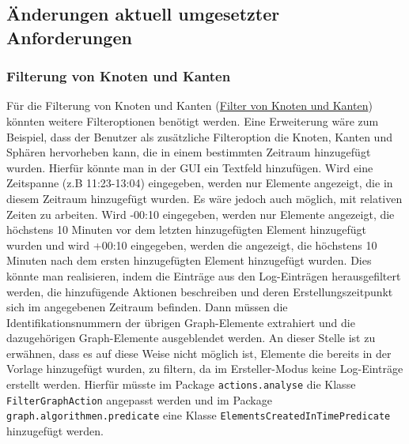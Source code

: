 \documentclass[enabledeprecatedfontcommands,fontsize=11pt,paper=a4,twoside]{scrartcl}
\newcounter{one}
\begin{document}
	\subsection{Änderungen aktuell umgesetzter Anforderungen}
	\subsubsection{Filterung von Knoten und Kanten}
	Für die Filterung von Knoten und Kanten (\hyperlink{ss}{Filter von Knoten und Kanten}) könnten weitere Filteroptionen benötigt werden. Eine Erweiterung wäre zum Beispiel, dass der Benutzer als zusätzliche Filteroption die Knoten, Kanten und Sphären hervorheben kann, die in einem bestimmten Zeitraum hinzugefügt wurden. Hierfür könnte man in der GUI  ein Textfeld hinzufügen. Wird eine Zeitspanne (z.B 11:23-13:04) eingegeben, werden nur Elemente angezeigt, die in diesem Zeitraum hinzugefügt wurden. Es wäre jedoch auch möglich, mit relativen Zeiten zu arbeiten. Wird -00:10 eingegeben, werden nur Elemente angezeigt, die höchstens 10 Minuten vor dem letzten hinzugefügten Element hinzugefügt wurden und wird +00:10 eingegeben, werden die angezeigt, die höchstens 10 Minuten nach dem ersten hinzugefügten Element hinzugefügt wurden. Dies könnte man realisieren, indem die Einträge aus den Log-Einträgen herausgefiltert werden, die hinzufügende Aktionen beschreiben und deren Erstellungszeitpunkt sich im angegebenen Zeitraum befinden. Dann müssen die Identifikationsnummern der übrigen Graph-Elemente extrahiert und die dazugehörigen Graph-Elemente ausgeblendet werden. An dieser Stelle ist zu erwähnen, dass es auf diese Weise nicht möglich ist, Elemente die bereits in der Vorlage hinzugefügt wurden, zu filtern, da im Ersteller-Modus keine Log-Einträge erstellt werden. Hierfür müsste im Package \texttt{actions.analyse} die Klasse \texttt{FilterGraphAction} angepasst werden und im Package \texttt{graph.algorithmen.predicate} eine Klasse \texttt{ElementsCreatedInTimePredicate} hinzugefügt werden. \\
	
\end{document}
